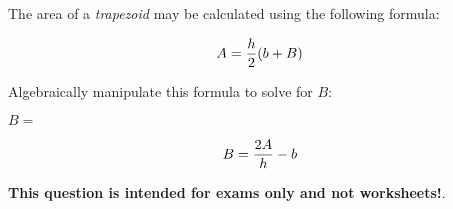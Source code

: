 

The area of a {\it trapezoid} may be calculated using the following formula:

$$A = {h \over 2} (b + B)$$

Algebraically manipulate this formula to solve for $B$:

\vskip 20pt

$B = $







$$B = {2 A \over h} - b$$







{\bf This question is intended for exams only and not worksheets!}.



